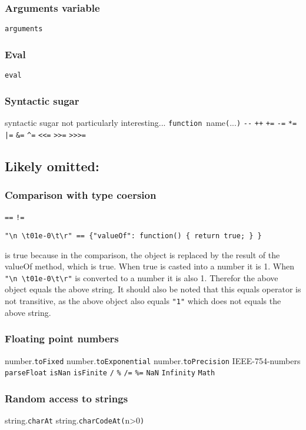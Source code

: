 \subsubsection{Arguments variable}
\verb|arguments|

\subsubsection{Eval}
\verb|eval|

\subsubsection{Syntactic sugar}
syntactic sugar not particularly interesting...
\verb|function|~name\verb|(|...\verb|)|
\verb|--|
\verb|++|
\verb|+=|
\verb|-=|
\verb|*=|
\verb$|=$
\verb|&=|
\verb|^=|
\verb|<<=|
\verb|>>=|
\verb|>>>=|

\subsection{Likely omitted:}
\subsubsection{Comparison with type coersion}
\verb|==|
\verb|!=|

\begin{verbatim}
"\n \t01e-0\t\r" == {"valueOf": function() { return true; } } 
\end{verbatim}
is true because in the comparison, the object is replaced by the result of the valueOf method, which is true. When true is casted into a number it is 1. When \verb|"\n \t01e-0\t\r"| is converted to a number it is also 1. Therefor the above object equals the above string. It should also be noted that this equals operator is not transitive, as the above object also equals \verb|"1"| which does not equals the above string.

\subsubsection{Floating point numbers}
number.\verb|toFixed|
number.\verb|toExponential|
number.\verb|toPrecision|
IEEE-754-numbers
\verb|parseFloat|
\verb|isNan|
\verb|isFinite|
\verb|/|
\verb|%|
\verb|/=|
\verb|%=|
\verb|NaN| \verb|Infinity|
\verb|Math|

\subsubsection{Random access to strings}
string.\verb|charAt|
string.\verb|charCodeAt(|n>0\verb|)|

